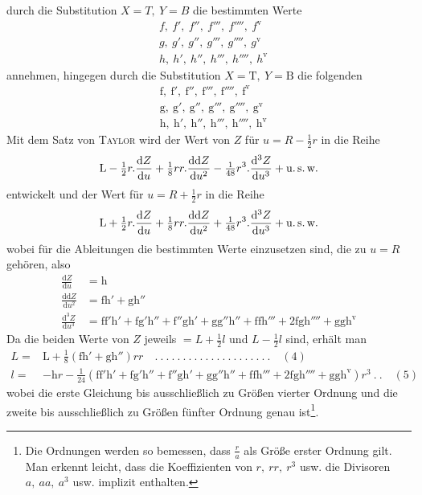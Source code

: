 %
durch die Substitution \(X=T,\ Y=B\) die bestimmten Werte
\[
\begin{aligned}
&f,\ f',\ f'',\ f''',\ f'''',\ f^{\mathrm{v}}\\
&g,\ g',\ g'',\ g''',\ g'''',\ g^{\mathrm{v}}\\
&h,\ h',\ h'',\ h''',\ h'''',\ h^{\mathrm{v}}
\end{aligned}
\]
annehmen, hingegen durch die Substitution \(X=\mathrm{T},\ Y=\mathrm{B}\) die folgenden
\[
\begin{aligned}
&\mathrm{f},\ \mathrm{f}',\ \mathrm{f}'',\ \mathrm{f}''',\ \mathrm{f}'''',\ \mathrm{f}^{\mathrm{v}}\\
&\mathrm{g},\ \mathrm{g}',\ \mathrm{g}'',\ \mathrm{g}''',\ \mathrm{g}'''',\ \mathrm{g}^{\mathrm{v}}\\
&\mathrm{h},\ \mathrm{h}',\ \mathrm{h}'',\ \mathrm{h}''',\ \mathrm{h}'''',\ \mathrm{h}^{\mathrm{v}}
\end{aligned}
\]
Mit dem Satz von \textsc{Taylor} wird der Wert von \(Z\) für \(u=R-\frac12r\) in die Reihe
\[
\mathrm{L}-\tfrac12r\mathord{.}\frac{\mathrm{d}Z}{\mathrm{d}u}+\tfrac18rr\mathord{.}\frac{\mathrm{dd}Z}{\mathrm{d}u^2}-\tfrac1{48}r^3\mathord{.}\frac{\mathrm{d}^3Z}{\mathrm{d}u^3}+\text{u.\,s.\,w.}
\]
entwickelt und der Wert für \(u=R+\frac12r\) in die Reihe
\[
\mathrm{L}+\tfrac12r\mathord{.}\frac{\mathrm{d}Z}{\mathrm{d}u}+\tfrac18rr\mathord{.}\frac{\mathrm{dd}Z}{\mathrm{d}u^2}+\tfrac1{48}r^3\mathord{.}\frac{\mathrm{d}^3Z}{\mathrm{d}u^3}+\text{u.\,s.\,w.}
\]
wobei für die Ableitungen die bestimmten Werte einzusetzen sind, die zu \(u=R\) gehören, also
\[
\begin{aligned}
\frac{\mathrm{d}Z}{\mathrm{d}u}&=\mathrm{h}\\
\frac{\mathrm{dd}Z}{\mathrm{d}u^2}&=\mathrm{fh}'+\mathrm{gh}''\\
\frac{\mathrm{d}^3Z}{\mathrm{d}u^3}&=\mathrm{ff'h}'+\mathrm{fg'h}''+\mathrm{f''gh}'+\mathrm{gg''h}''+\mathrm{ffh}'''+2\mathrm{fgh}''''+\mathrm{ggh}^{\mathrm{v}}
\end{aligned}
\]
Da die beiden Werte von \(Z\) jeweils \(=L+\frac12l\) und \(L-\frac12l\) sind, erhält man
\begingroup\fontsize{10}{12}\selectfont
\[
\begin{aligned}
L={}&\mathrm{L}+\tfrac18(\mathrm{fh}'+\mathrm{gh}'')rr\quad .\ .\ .\ .\ .\ .\ .\ .\ .\ .\ .\ .\ .\ .\ .\ .\ .\ .\ .\ .\ .\quad(4)\\
l={}&-\mathrm{h}r-\tfrac1{24}(\mathrm{ff'h}'+\mathrm{fg'h}''+\mathrm{f''gh}'+\mathrm{gg''h}''+\mathrm{ffh}'''+2\mathrm{fgh}''''+\mathrm{ggh}^{\mathrm{v}})r^3\ .\ .\quad(5)
\end{aligned}
\]
\endgroup
wobei die erste Gleichung bis ausschließlich zu Größen vierter Ordnung und die zweite bis ausschließlich zu Größen fünfter Ordnung genau ist\footnote{Die Ordnungen werden so bemessen, dass \(\frac ra\) als Größe erster Ordnung gilt. Man erkennt leicht, dass die Koeffizienten von \(r,\ rr,\ r^3\) usw. die Divisoren \(a,\ aa,\ a^3\) usw. implizit enthalten.}.
